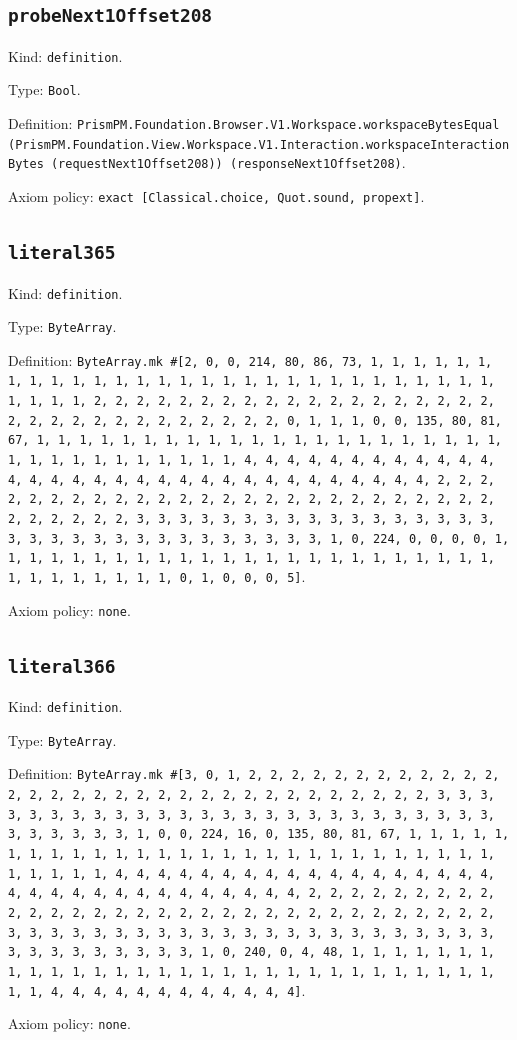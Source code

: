 \documentclass[11pt]{article}
\begin{document}
\subsection*{\texttt{probeNext1Offset208}}
\noindent Kind: \texttt{definition}.\par
\noindent Type: \texttt{Bool}.\par
\noindent Definition: \texttt{PrismPM.Foundation.Browser.V1.Workspace.workspaceBytesEqual (PrismPM.Foundation.View.Workspace.V1.Interaction.workspaceInteractionBytes (requestNext1Offset208)) (responseNext1Offset208)}.\par
\noindent Axiom policy: \texttt{exact [Classical.choice, Quot.sound, propext]}.\par
\subsection*{\texttt{literal365}}
\noindent Kind: \texttt{definition}.\par
\noindent Type: \texttt{ByteArray}.\par
\noindent Definition: \texttt{ByteArray.mk \#[2, 0, 0, 214, 80, 86, 73, 1, 1, 1, 1, 1, 1, 1, 1, 1, 1, 1, 1, 1, 1, 1, 1, 1, 1, 1, 1, 1, 1, 1, 1, 1, 1, 1, 1, 1, 1, 1, 1, 1, 2, 2, 2, 2, 2, 2, 2, 2, 2, 2, 2, 2, 2, 2, 2, 2, 2, 2, 2, 2, 2, 2, 2, 2, 2, 2, 2, 2, 2, 2, 2, 2, 0, 1, 1, 1, 0, 0, 135, 80, 81, 67, 1, 1, 1, 1, 1, 1, 1, 1, 1, 1, 1, 1, 1, 1, 1, 1, 1, 1, 1, 1, 1, 1, 1, 1, 1, 1, 1, 1, 1, 1, 1, 1, 1, 4, 4, 4, 4, 4, 4, 4, 4, 4, 4, 4, 4, 4, 4, 4, 4, 4, 4, 4, 4, 4, 4, 4, 4, 4, 4, 4, 4, 4, 4, 4, 4, 2, 2, 2, 2, 2, 2, 2, 2, 2, 2, 2, 2, 2, 2, 2, 2, 2, 2, 2, 2, 2, 2, 2, 2, 2, 2, 2, 2, 2, 2, 2, 2, 3, 3, 3, 3, 3, 3, 3, 3, 3, 3, 3, 3, 3, 3, 3, 3, 3, 3, 3, 3, 3, 3, 3, 3, 3, 3, 3, 3, 3, 3, 3, 3, 1, 0, 224, 0, 0, 0, 0, 1, 1, 1, 1, 1, 1, 1, 1, 1, 1, 1, 1, 1, 1, 1, 1, 1, 1, 1, 1, 1, 1, 1, 1, 1, 1, 1, 1, 1, 1, 1, 1, 0, 1, 0, 0, 0, 5]}.\par
\noindent Axiom policy: \texttt{none}.\par
\subsection*{\texttt{literal366}}
\noindent Kind: \texttt{definition}.\par
\noindent Type: \texttt{ByteArray}.\par
\noindent Definition: \texttt{ByteArray.mk \#[3, 0, 1, 2, 2, 2, 2, 2, 2, 2, 2, 2, 2, 2, 2, 2, 2, 2, 2, 2, 2, 2, 2, 2, 2, 2, 2, 2, 2, 2, 2, 2, 2, 2, 2, 3, 3, 3, 3, 3, 3, 3, 3, 3, 3, 3, 3, 3, 3, 3, 3, 3, 3, 3, 3, 3, 3, 3, 3, 3, 3, 3, 3, 3, 3, 3, 3, 1, 0, 0, 224, 16, 0, 135, 80, 81, 67, 1, 1, 1, 1, 1, 1, 1, 1, 1, 1, 1, 1, 1, 1, 1, 1, 1, 1, 1, 1, 1, 1, 1, 1, 1, 1, 1, 1, 1, 1, 1, 1, 1, 4, 4, 4, 4, 4, 4, 4, 4, 4, 4, 4, 4, 4, 4, 4, 4, 4, 4, 4, 4, 4, 4, 4, 4, 4, 4, 4, 4, 4, 4, 4, 4, 2, 2, 2, 2, 2, 2, 2, 2, 2, 2, 2, 2, 2, 2, 2, 2, 2, 2, 2, 2, 2, 2, 2, 2, 2, 2, 2, 2, 2, 2, 2, 2, 3, 3, 3, 3, 3, 3, 3, 3, 3, 3, 3, 3, 3, 3, 3, 3, 3, 3, 3, 3, 3, 3, 3, 3, 3, 3, 3, 3, 3, 3, 3, 3, 1, 0, 240, 0, 4, 48, 1, 1, 1, 1, 1, 1, 1, 1, 1, 1, 1, 1, 1, 1, 1, 1, 1, 1, 1, 1, 1, 1, 1, 1, 1, 1, 1, 1, 1, 1, 1, 1, 4, 4, 4, 4, 4, 4, 4, 4, 4, 4, 4, 4]}.\par
\noindent Axiom policy: \texttt{none}.\par
\end{document}
